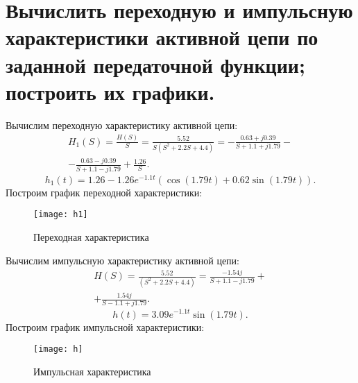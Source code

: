 \documentclass[a4paper,14pt ]{article} %
\begin{document}
    \section{Вычислить переходную и 
    импульсную характеристики активной цепи по
     заданной передаточной функции; построить их графики.}
    Вычислим переходную характеристику активной цепи:
    \begin{multline}
        H_1(S) = \frac{H(S)}{S}= \frac{5.52}{S(S^2 + 2.2S+ 4.4)} = 
        -\frac{0.63 + j0.39}{S+1.1 + j1.79} - \\ - \frac{0.63 - j0.39}{S + 1.1 - j1.79} + \frac{1.26}{S}.
    \end{multline}
    \begin{equation}
        h_1(t) = 1.26 - 1.26e^{-1.1t}(\cos(1.79t) + 0.62\sin(1.79t)).
    \end{equation}
    Построим график переходной характеристики:
    \begin{figure}[H]
        \texttt{[image: h1]}
        \centering
        \caption{Переходная характеристика}
    \end{figure}
    Вычислим импульсную характеристику активной цепи:
    \begin{multline}
        H(S) = \frac{5.52}{(S^2 + 2.2S+ 4.4)} = \frac{-1.54j}{S + 1.1 - j1.79} + \\ 
        + \frac{1.54j}{S - 1.1 + j1.79}.
    \end{multline}
    \begin{equation}
        h(t) = 3.09e^{-1.1t}\sin(1.79t).
    \end{equation}
    Построим график импульсной характеристики:
    \begin{figure}[H]
        \texttt{[image: h]}
        \centering
        \caption{Импульсная характеристика}
    \end{figure}
\end{document}
